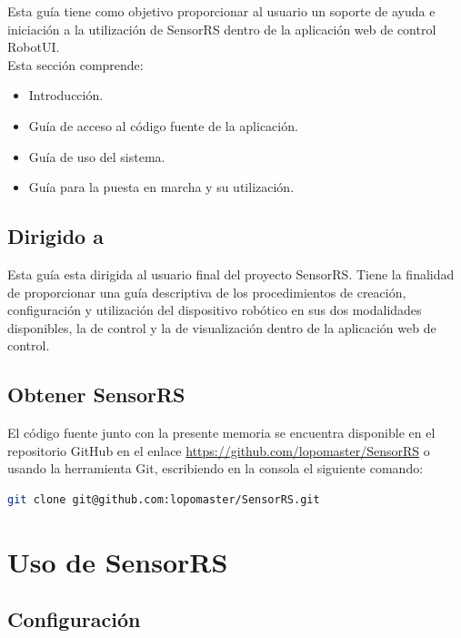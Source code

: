 Esta guía tiene como objetivo proporcionar al usuario un soporte de ayuda e iniciación a la utilización de SensorRS dentro de la aplicación web de control RobotUI.\\

Esta sección comprende:\\

\begin{itemize}
 \item Introducción.
 \item Guía de acceso al código fuente de la aplicación.
 \item Guía de uso del sistema.
 \item Guía para la puesta en marcha y su utilización.
\end{itemize}

\subsection{Dirigido a}

Esta guía esta dirigida al usuario final del proyecto SensorRS. Tiene la finalidad de proporcionar una guía descriptiva de los procedimientos de creación, configuración y utilización del dispositivo 
robótico en sus dos modalidades disponibles, la de control y la de visualización dentro de la aplicación web de control.

\subsection{Obtener SensorRS}

El código fuente junto con la presente memoria se encuentra disponible en el repositorio GitHub en el enlace \url{https://github.com/lopomaster/SensorRS} o usando la herramienta
Git, escribiendo en la consola el siguiente comando:\\

\begin{lstlisting}[language=bash]
 git clone git@github.com:lopomaster/SensorRS.git 
\end{lstlisting}


\section{ Uso de SensorRS }
\label{sec:uso-sensorrs}


\subsection{ Configuración }
\label{sec:configuracion}

